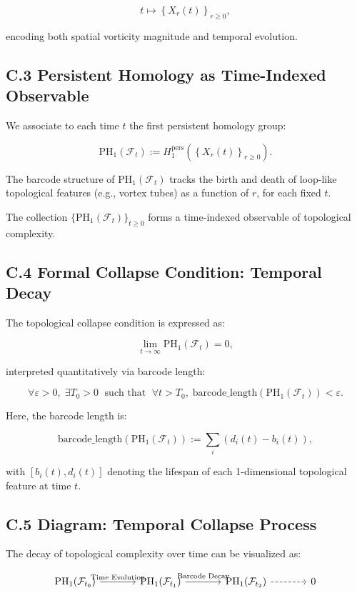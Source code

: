 \documentclass[11pt]{article}
\begin{document}
\[
t \mapsto \left\{ X_r(t) \right\}_{r \geq 0},
\]

encoding both spatial vorticity magnitude and temporal evolution.

\subsection*{C.3 Persistent Homology as Time-Indexed Observable}

We associate to each time \( t \) the first persistent homology group:

\[
\mathrm{PH}_1(\mathcal{F}_t) := H_1^{\mathrm{pers}} \left( \left\{ X_r(t) \right\}_{r \geq 0} \right).
\]

The barcode structure of \( \mathrm{PH}_1(\mathcal{F}_t) \) tracks the birth and death of loop-like topological features (e.g., vortex tubes) as a function of \( r \), for each fixed \( t \).

The collection \( \{ \mathrm{PH}_1(\mathcal{F}_t) \}_{t \geq 0} \) forms a time-indexed observable of topological complexity.

\subsection*{C.4 Formal Collapse Condition: Temporal Decay}

The topological collapse condition is expressed as:

\[
\lim_{t \to \infty} \mathrm{PH}_1(\mathcal{F}_t) = 0,
\]

interpreted quantitatively via barcode length:

\[
\forall \varepsilon > 0,\; \exists T_0 > 0 \;\text{ such that }\; \forall t > T_0,\;
\mathrm{barcode\_length}(\mathrm{PH}_1(\mathcal{F}_t)) < \varepsilon.
\]

Here, the barcode length is:

\[
\mathrm{barcode\_length}(\mathrm{PH}_1(\mathcal{F}_t)) := \sum_{i} (d_i(t) - b_i(t)),
\]

with \( [b_i(t), d_i(t)] \) denoting the lifespan of each 1-dimensional topological feature at time \( t \).

\subsection*{C.5 Diagram: Temporal Collapse Process}

The decay of topological complexity over time can be visualized as:

\[
\begin{tikzcd}[row sep=large, column sep=large]
\mathrm{PH}_1(\mathcal{F}_{t_0})
  \arrow[r, "\text{Time Evolution}"]
& \mathrm{PH}_1(\mathcal{F}_{t_1})
  \arrow[r, "\text{Barcode Decay}"]
& \mathrm{PH}_1(\mathcal{F}_{t_2})
  \arrow[r, dashed]
& 0
\end{tikzcd}
\]
\end{document}
